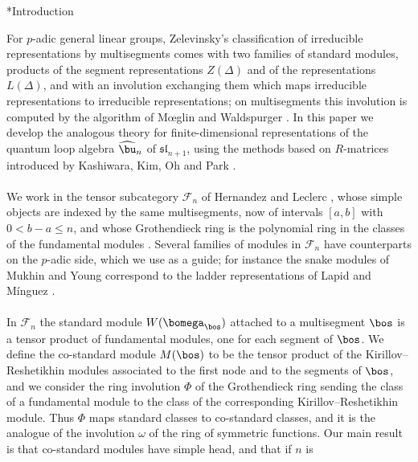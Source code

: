 \documentclass[11pt,reqno]{amsart}
\makeatletter
\theoremstyle{definition} \newtheorem*{defn}{Definition}
\theoremstyle{definition}
\numberwithin{equation}{section}
\newcommand{\lie}[1]{\mathfrak{#1}}
\def\section{\def\@secnumfont{\mdseries}\@startsection{section}{1}%
  \z@{.7\linespacing\@plus\linespacing}{.5\linespacing}%
  {\normalfont\scshape\centering}}
\makeatother
\begin{document}
\maketitle




\section*{Introduction}

For $p$-adic general linear groups, Zelevinsky's classification of irreducible representations by multisegments comes with
two families of standard modules, products of the segment representations $Z(\Delta)$ and of the representations $L(\Delta)$,
and with an involution exchanging them which maps irreducible representations to irreducible representations; on
multisegments this involution is computed by the algorithm of M\oe glin and Waldspurger \cite{MW86}. In this paper we
develop the analogous theory for finite-dimensional representations of the quantum loop algebra $\widehat\bu_n$ of $\lie{sl}_{n+1}$,
using the methods based on $R$-matrices introduced by Kashiwara, Kim, Oh and Park \cite{KKOP}.
\\\\
We work in the tensor subcategory $\mathscr F_n$ of Hernandez and Leclerc \cite{HL10}, whose simple objects are indexed by the
same multisegments, now of intervals $[a,b]$ with $0<b-a\le n$, and whose Grothendieck ring is the polynomial ring in the
classes of the fundamental modules \cite{FR99}. Several families of modules in $\mathscr F_n$ have counterparts on the $p$-adic
side, which we use as a guide; for instance the snake modules of Mukhin and Young \cite{MY12} correspond to the ladder
representations of Lapid and M\'inguez \cite{LM14}.
\\\\
In $\mathscr F_n$ the standard module $W(\bomega_\bos)$ attached to a multisegment $\bos$ is a tensor product of fundamental modules,
one for each segment of $\bos$. We define the co-standard module $M(\bos)$ to be the tensor product of the
Kirillov--Reshetikhin modules associated to the first node and to the segments of $\bos$, and we consider the ring involution
$\Phi$ of the Grothendieck ring sending the class of a fundamental module to the class of the corresponding
Kirillov--Reshetikhin module. Thus $\Phi$ maps standard classes to co-standard classes, and it is the analogue of the involution
$\omega$ of the ring of symmetric functions. Our main result is that co-standard modules have simple head, and that if $n$ is
\end{document}
